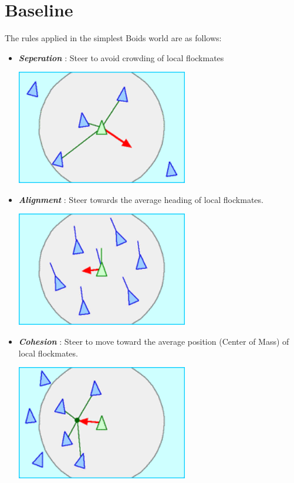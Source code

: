 \documentclass[12pt]{report}
\begin{document}
\section{Baseline}
\label{sec:baseline}

The rules applied in the simplest Boids world are as follows:

\begin{itemize}
  \item
  \textbf{\textit{Seperation}} : Steer to avoid crowding of local flockmates
    \begin{center}
      \includegraphics[height=5cm]{Rule_separation.png}
    \end{center}
  \item
  \textbf{\textit{Alignment}} : Steer towards the average heading of local flockmates.
  \begin{center}
    \includegraphics[height=5cm]{Rule_alignment.png}
  \end{center}
  \item
  \textbf{\textit{Cohesion}} : Steer to move toward the average position (Center of Mass) of local flockmates.
    \begin{center}
    \includegraphics[height=5cm]{Rule_cohesion.png}
  \end{center}
\end{itemize}
\end{document}
